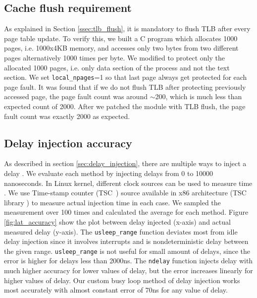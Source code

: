 \subsection{Cache flush requirement} \label{ssec:cache_flush_eval}
As explained in Section \ref{ssec:tlb_flush}, it is mandatory to flush TLB after every page table update. To verify this, we built a C program which allocates 1000 pages, i.e. 1000x4KB memory, and accesses only two bytes from two different pages alternatively 1000 times per byte. We modified {\dime} to protect only the allocated 1000 pages, i.e. only data section of the process and not the text section. We set \verb|local_npages|=1 so that last page always get protected for each page fault. It was found that if we do not flush TLB after protecting previously accessed page, the page fault count was around $\sim$200, which is much less than expected count of 2000. After we patched the module with TLB flush, the page fault count was exactly 2000 as expected.


\subsection{Delay injection accuracy} \label{ssec:delay_eval}
As described in section \ref{sec:delay_injection}, there are multiple ways to inject a delay \cite{timers}. We evaluate each method by injecting delays from 0 to 10000 nanoseconds. In Linux kernel, different clock sources \cite{clock_sources} can be used to measure time \cite{measure_timelapse}. We use Time-stamp counter (TSC~\cite{tsc}) source available in x86 architecture (TSC library \cite{tsclibrary}) to measure actual injection time in each case. We sampled the measurement over 100 times and calculated the average for each method. Figure \ref{fig:lat_accuracy} show the plot between delay injected (x-axis) and actual measured delay (y-axis). The \verb|usleep_range| function deviates most from idle delay injection since it involves interrupts and is nondeterministic delay between the given range. \verb|usleep_range| is not useful for small amount of delays, since the error is higher for delays less than 2000ns. The \verb|ndelay| function injects delay with much higher accuracy for lower values of delay, but the error increases linearly for higher values of delay. Our custom busy loop method of delay injection works most accurately with almost constant error of 70ns for any value of delay.

